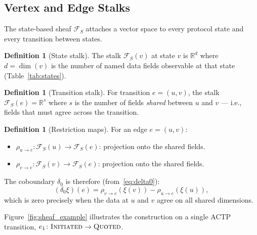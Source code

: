 \documentclass[11pt]{article}
\theoremstyle{plain}
\theoremstyle{definition}
\newtheorem{definition}[theorem]{Definition}
\newcommand{\Fsh}{\mathcal{F}}         %
\newcommand{\deltazero}{\delta_{0}}
\newcommand{\RR}{\mathbb{R}}
\newcommand{\dimn}{\operatorname{dim}}
\newcommand{\sINIT}{\textsc{Initiated}}
\newcommand{\sQUOT}{\textsc{Quoted}}
\begin{document}
\subsection{Vertex and Edge Stalks}
\label{sec:stalks}

The state-based sheaf $\Fsh_S$ attaches a vector space to every protocol
state and every transition between states.

\begin{definition}[State stalk]\label{def:state_stalk}
The stalk $\Fsh_S(v)$ at state $v$ is $\RR^d$ where $d = \dimn(v)$ is the
number of named data fields observable at that state (Table~\ref{tab:states}).
\end{definition}

\begin{definition}[Transition stalk]\label{def:trans_stalk}
For transition $e = (u, v)$, the stalk $\Fsh_S(e) = \RR^s$ where $s$ is
the number of fields \emph{shared} between $u$ and $v$ --- i.e., fields that
must agree across the transition.
\end{definition}

\begin{definition}[Restriction maps]\label{def:restriction}
For an edge $e = (u,v)$:
\begin{itemize}
  \item $\rho_{u\to e} \colon \Fsh_S(u) \to \Fsh_S(e)$: projection onto
        the shared fields.
  \item $\rho_{v\to e} \colon \Fsh_S(v) \to \Fsh_S(e)$: projection onto
        the shared fields.
\end{itemize}
\end{definition}

The coboundary $\deltazero$ is therefore (from~\eqref{eq:delta0}):
\[
  (\deltazero\xi)(e) = \rho_{v\to e}(\xi(v)) - \rho_{u\to e}(\xi(u)),
\]
which is zero precisely when the data at $u$ and $v$ agree on all shared
dimensions.

Figure~\ref{fig:sheaf_example} illustrates the construction on a single ACTP
transition, $e_1 \colon \sINIT \to \sQUOT$.
\end{document}

